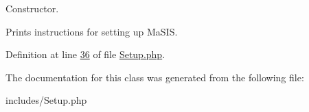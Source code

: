 Constructor. 

Prints instructions for setting up Ma\-S\-I\-S. 

Definition at line \hyperlink{Setup_8php_source_l00036}{36} of file \hyperlink{Setup_8php_source}{Setup.\-php}.



The documentation for this class was generated from the following file\-:\begin{DoxyCompactItemize}
\item 
includes/Setup.\-php\end{DoxyCompactItemize}
